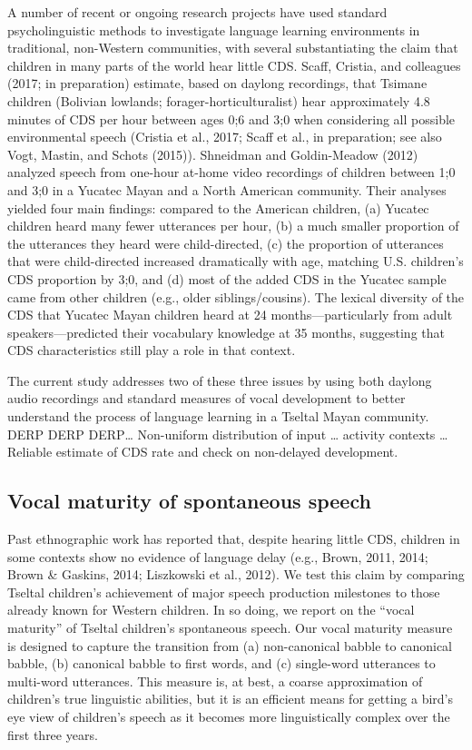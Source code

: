 \documentclass[floatsintext,man]{apa6}
\theoremstyle{definition}
\theoremstyle{definition}
\theoremstyle{definition}
\theoremstyle{remark}
\begin{document}
A number of recent or ongoing research projects have used standard
psycholinguistic methods to investigate language learning environments
in traditional, non-Western communities, with several substantiating the
claim that children in many parts of the world hear little CDS. Scaff,
Cristia, and colleagues (2017; in preparation) estimate, based on
daylong recordings, that Tsimane children (Bolivian lowlands;
forager-horticulturalist) hear approximately 4.8 minutes of CDS per hour
between ages 0;6 and 3;0 when considering all possible environmental
speech (Cristia et al., 2017; Scaff et al., in preparation; see also
Vogt, Mastin, and Schots (2015)). Shneidman and Goldin-Meadow (2012)
analyzed speech from one-hour at-home video recordings of children
between 1;0 and 3;0 in a Yucatec Mayan and a North American community.
Their analyses yielded four main findings: compared to the American
children, (a) Yucatec children heard many fewer utterances per hour, (b)
a much smaller proportion of the utterances they heard were
child-directed, (c) the proportion of utterances that were
child-directed increased dramatically with age, matching U.S. children's
CDS proportion by 3;0, and (d) most of the added CDS in the Yucatec
sample came from other children (e.g., older siblings/cousins). The
lexical diversity of the CDS that Yucatec Mayan children heard at 24
months---particularly from adult speakers---predicted their vocabulary
knowledge at 35 months, suggesting that CDS characteristics still play a
role in that context.

The current study addresses two of these three issues by using both
daylong audio recordings and standard measures of vocal development to
better understand the process of language learning in a Tseltal Mayan
community. DERP DERP DERP\ldots{} Non-uniform distribution of input
\ldots{} activity contexts \ldots{} Reliable estimate of CDS rate and
check on non-delayed development.

\subsection{Vocal maturity of spontaneous
speech}\label{vocal-maturity-of-spontaneous-speech}

Past ethnographic work has reported that, despite hearing little CDS,
children in some contexts show no evidence of language delay (e.g.,
Brown, 2011, 2014; Brown \& Gaskins, 2014; Liszkowski et al., 2012). We
test this claim by comparing Tseltal children's achievement of major
speech production milestones to those already known for Western
children. In so doing, we report on the \enquote{vocal maturity} of
Tseltal children's spontaneous speech. Our vocal maturity measure is
designed to capture the transition from (a) non-canonical babble to
canonical babble, (b) canonical babble to first words, and (c)
single-word utterances to multi-word utterances. This measure is, at
best, a coarse approximation of children's true linguistic abilities,
but it is an efficient means for getting a bird's eye view of children's
speech as it becomes more linguistically complex over the first three
years.
\end{document}
